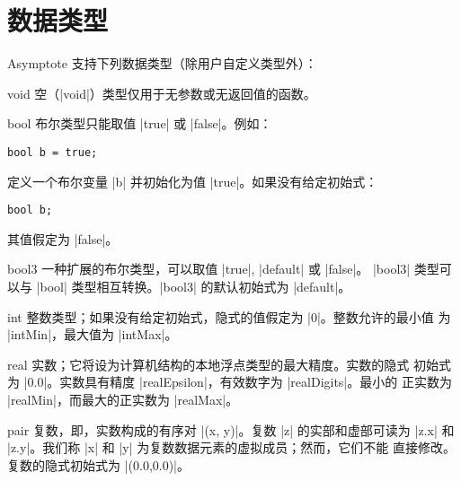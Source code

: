 \documentclass{ctexbook}
\makeatletter
\newenvironment{typelist}{\itemize
  \let\old@item\@item
  \def\@item[##1]{\expandafter\old@item[\ttfamily\color{type!50!black}##1]}}
{\enditemize}
\newcommand*\prgname[1]{\textsf{#1}}
\makeatother
\begin{document}
\section{数据类型}

\prgname{Asymptote} 支持下列数据类型（除用户自定义类型外）：
\begin{typelist}

\item[void] 空（|void|）类型仅用于无参数或无返回值的函数。

\item[bool] 布尔类型只能取值 |true| 或 |false|。例如：
\begin{lstlisting}
bool b = true;
\end{lstlisting}
定义一个布尔变量 |b| 并初始化为值 |true|。如果没有给定初始式：
\begin{lstlisting}
bool b;
\end{lstlisting}
其值假定为 |false|。

\item[bool3] 一种扩展的布尔类型，可以取值 |true|, |default| 或 |false|。
|bool3| 类型可以与 |bool| 类型相互转换。|bool3| 的默认初始式为 |default|。

\item[int] 整数类型；如果没有给定初始式，隐式的值假定为 |0|。整数允许的最小值
为 |intMin|，最大值为 |intMax|。

\item[real] 实数；它将设为计算机结构的本地浮点类型的最大精度。实数的隐式
初始式为 |0.0|。实数具有精度 |realEpsilon|，有效数字为 |realDigits|。最小的
正实数为 |realMin|，而最大的正实数为 |realMax|。

\item[pair] 复数，即，实数构成的有序对 |(x, y)|。复数 |z| 的实部和虚部可读为
|z.x| 和 |z.y|。我们称 |x| 和 |y| 为复数数据元素的虚拟成员；然而，它们不能
直接修改。复数的隐式初始式为 |(0.0,0.0)|。


\end{typelist}
\end{document}

